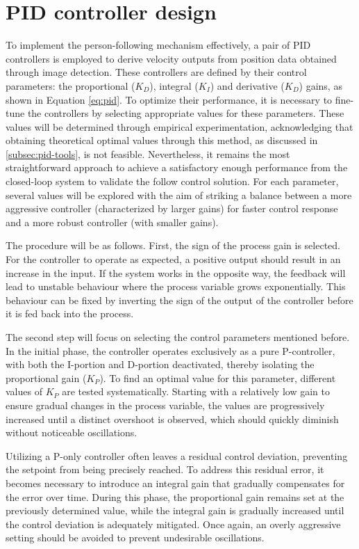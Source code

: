 \section{PID controller design}
\label{sec:test-1-pid}

To implement the person-following mechanism effectively, a pair of PID controllers is employed to derive velocity outputs from position data obtained through image detection. These controllers are defined by their control parameters: the proportional ($K_D$), integral ($K_I$) and derivative ($K_D$) gains, as shown in Equation \ref{eq:pid}. To optimize their performance, it is necessary to fine-tune the controllers by selecting appropriate values for these parameters. These values will be determined through empirical experimentation, acknowledging that obtaining theoretical optimal values through this method, as discussed in \ref{subsec:pid-tools}, is not feasible. Nevertheless, it remains the most straightforward approach to achieve a satisfactory enough performance from the closed-loop system to validate the follow control solution. For each parameter, several values will be explored with the aim of striking a balance between a more aggressive controller (characterized by larger gains) for faster control response and a more robust controller (with smaller gains).

The procedure will be as follows. First, the sign of the process gain is selected. For the controller to operate as expected, a positive output should result in an increase in the input. If the system works in the opposite way, the feedback will lead to unstable behaviour where the process variable grows exponentially. This behaviour can be fixed by inverting the sign of the output of the controller before it is fed back into the process.

The second step will focus on selecting the control parameters mentioned before. In the initial phase, the controller operates exclusively as a pure P-controller, with both the I-portion and D-portion deactivated, thereby isolating the proportional gain ($K_P$). To find an optimal value for this parameter, different values of $K_P$ are tested systematically. Starting with a relatively low gain to ensure gradual changes in the process variable, the values are progressively increased until a distinct overshoot is observed, which should quickly diminish without noticeable oscillations.

Utilizing a P-only controller often leaves a residual control deviation, preventing the setpoint from being precisely reached. To address this residual error, it becomes necessary to introduce an integral gain that gradually compensates for the error over time. During this phase, the proportional gain remains set at the previously determined value, while the integral gain is gradually increased until the control deviation is adequately mitigated. Once again, an overly aggressive setting should be avoided to prevent undesirable oscillations.


